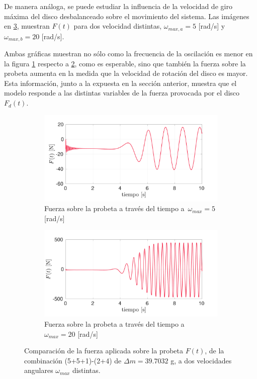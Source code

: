 De manera análoga, se puede estudiar la influencia de la velocidad de giro máxima del disco desbalanceado sobre el movimiento del sistema. Las imágenes en \ref{fig:f_w520}, muestran $F(t)$ para dos velocidad distintas, $\omega_{max,a} = 5$ [rad/s] y $\omega_{max,b}=20$ [rad/s]. 

Ambas gráficas muestran no sólo como la frecuencia de la oscilación es menor en la figura \ref{fig:f_w5} respecto a \ref{fig:f_w20}, como es esperable, sino que también la fuerza sobre la probeta aumenta en la medida que la velocidad de rotación del disco es mayor. Esta información, junto a la expuesta en la sección anterior, muestra que el modelo responde a las distintas variables de la fuerza provocada por el disco $F_d(t)$. 

\begin{figure}[p]
\centering
	\begin{subfigure}{1\linewidth}
		\centering
		\includegraphics[width=\linewidth, trim={0cm 0cm 2cm 0cm},clip]{Imagenes/f_w5.pdf}
		\caption{Fuerza sobre la probeta a través del tiempo a $\,\omega_{max}=5$ [rad/s]}
		\label{fig:f_w5}
	\end{subfigure}
	\begin{subfigure}{1\linewidth}
		\centering
		\includegraphics[width=\linewidth, trim={0cm 0cm 2cm 0cm},clip]{Imagenes/f_w20.pdf}
		\caption{Fuerza sobre la probeta a través del tiempo a $\omega_{max}=20$ [rad/s]}
		\label{fig:f_w20}
	\end{subfigure}
\caption{Comparación de la fuerza aplicada sobre la probeta $F(t)$, de la combinación (5+5+1)-(2+4) de $\Delta m = 39.7032$ g, a dos velocidades angulares $\omega_{max}$ distintas.}
\label{fig:f_w520}
\end{figure}

